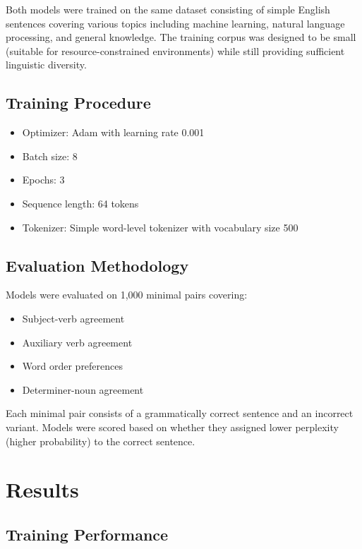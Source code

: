 \documentclass[11pt,a4paper]{article}
\begin{document}
Both models were trained on the same dataset consisting of simple English sentences covering various topics including machine learning, natural language processing, and general knowledge. The training corpus was designed to be small (suitable for resource-constrained environments) while still providing sufficient linguistic diversity.

\subsection{Training Procedure}

\begin{itemize}
    \item Optimizer: Adam with learning rate 0.001
    \item Batch size: 8
    \item Epochs: 3
    \item Sequence length: 64 tokens
    \item Tokenizer: Simple word-level tokenizer with vocabulary size 500
\end{itemize}

\subsection{Evaluation Methodology}

Models were evaluated on 1,000 minimal pairs covering:
\begin{itemize}
    \item Subject-verb agreement
    \item Auxiliary verb agreement
    \item Word order preferences
    \item Determiner-noun agreement
\end{itemize}

Each minimal pair consists of a grammatically correct sentence and an incorrect variant. Models were scored based on whether they assigned lower perplexity (higher probability) to the correct sentence.

\section{Results}

\subsection{Training Performance}
\end{document}
